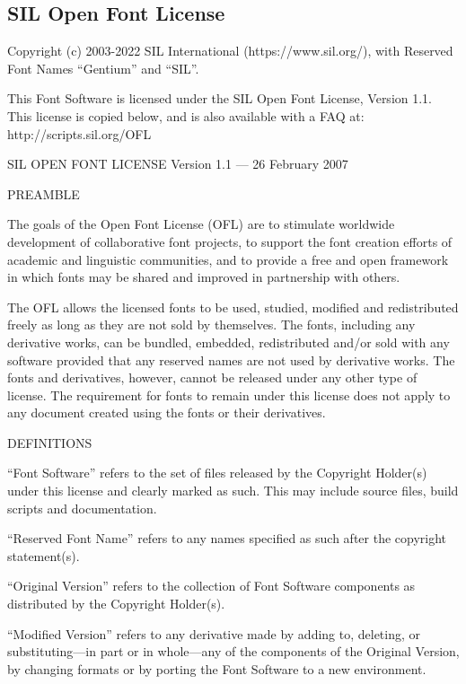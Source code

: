 \documentclass[12pt, english]{article}
\begin{document}
\begin{raggedright}\small %
\subsection{SIL Open Font License}


Copyright (c) 2003-2022 SIL International (https://www.sil.org/),
with Reserved Font Names ``Gentium'' and ``SIL''.

This Font Software is licensed under the SIL Open Font License, Version 1.1.
This license is copied below, and is also available with a FAQ at:
http://scripts.sil.org/OFL


SIL OPEN FONT LICENSE Version 1.1 --- 26 February 2007


PREAMBLE

The goals of the Open Font License (OFL) are to stimulate worldwide
development of collaborative font projects, to support the font creation
efforts of academic and linguistic communities, and to provide a free and
open framework in which fonts may be shared and improved in partnership
with others.

The OFL allows the licensed fonts to be used, studied, modified and
redistributed freely as long as they are not sold by themselves. The
fonts, including any derivative works, can be bundled, embedded, 
redistributed and/or sold with any software provided that any reserved
names are not used by derivative works. The fonts and derivatives,
however, cannot be released under any other type of license. The
requirement for fonts to remain under this license does not apply
to any document created using the fonts or their derivatives.


DEFINITIONS

``Font Software'' refers to the set of files released by the Copyright
Holder(s) under this license and clearly marked as such. This may
include source files, build scripts and documentation.

``Reserved Font Name'' refers to any names specified as such after the
copyright statement(s).

``Original Version'' refers to the collection of Font Software components as
distributed by the Copyright Holder(s).

``Modified Version'' refers to any derivative made by adding to, deleting,
or substituting---in part or in whole---any of the components of the
Original Version, by changing formats or by porting the Font Software to a
new environment.


\end{raggedright}
\end{document}
